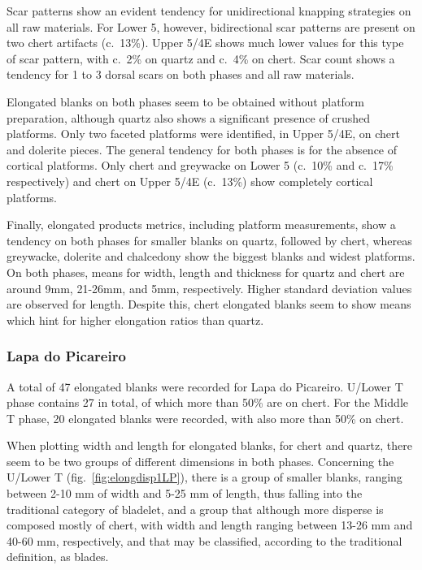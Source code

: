 \documentclass[12pt,twoside]{reedthesis}
\begin{document}
Scar patterns show an evident tendency for unidirectional knapping strategies on all raw materials. For Lower 5, however, bidirectional scar patterns are present on two chert artifacts (c.~13\%). Upper 5/4E shows much lower values for this type of scar pattern, with c.~2\% on quartz and c.~4\% on chert. Scar count shows a tendency for 1 to 3 dorsal scars on both phases and all raw materials.

Elongated blanks on both phases seem to be obtained without platform preparation, although quartz also shows a significant presence of crushed platforms. Only two faceted platforms were identified, in Upper 5/4E, on chert and dolerite pieces. The general tendency for both phases is for the absence of cortical platforms. Only chert and greywacke on Lower 5 (c.~10\% and c.~17\% respectively) and chert on Upper 5/4E (c.~13\%) show completely cortical platforms.

Finally, elongated products metrics, including platform measurements, show a tendency on both phases for smaller blanks on quartz, followed by chert, whereas greywacke, dolerite and chalcedony show the biggest blanks and widest platforms. On both phases, means for width, length and thickness for quartz and chert are around 9mm, 21-26mm, and 5mm, respectively. Higher standard deviation values are observed for length. Despite this, chert elongated blanks seem to show means which hint for higher elongation ratios than quartz.

\hypertarget{lapa-do-picareiro-6}{%
\subsubsection{Lapa do Picareiro}\label{lapa-do-picareiro-6}}

A total of 47 elongated blanks were recorded for Lapa do Picareiro. U/Lower T phase contains 27 in total, of which more than 50\% are on chert. For the Middle T phase, 20 elongated blanks were recorded, with also more than 50\% on chert.

When plotting width and length for elongated blanks, for chert and quartz, there seem to be two groups of different dimensions in both phases. Concerning the U/Lower T (fig.~\ref{fig:elongdisp1LP}), there is a group of smaller blanks, ranging between 2-10 mm of width and 5-25 mm of length, thus falling into the traditional category of bladelet, and a group that although more disperse is composed mostly of chert, with width and length ranging between 13-26 mm and 40-60 mm, respectively, and that may be classified, according to the traditional definition, as blades.
\end{document}
